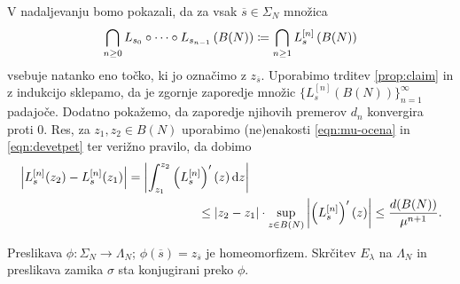 V nadaljevanju bomo pokazali, da za vsak \(\overline{s} \in \Sigma_N\) množica
\[\bigcap_{n \geq 0} L_{s_0} \circ \dots \circ L_{s_{n - 1}} \left( B (N) \right) \coloneq \bigcap_{n \geq 1} L_s^{[n]} \left( B (N) \right)\]
vsebuje natanko eno točko, ki jo označimo z \(z_{\overline{s}}\). Uporabimo trditev \ref{prop:claim} in z indukcijo sklepamo, da je zgornje zaporedje množic \(\{L_s^{[n]} (B (N))\}_{n = 1}^{\infty}\) padajoče. Dodatno pokažemo, da zaporedje njihovih premerov \(d_n\) konvergira proti \num{0}. Res, za \(z_1, z_2 \in B(N)\) uporabimo (ne)enakosti \eqref{eqn:mu-ocena} in \eqref{eqn:devetpet} ter verižno pravilo, da dobimo
\[ \begin{multlined}[12cm]
    \left| L_s^{[n]}(z_2) - L_s^{[n]}(z_1) \right| = \left| \int_{z_1}^{z_2} \prt{L_s^{[n]}}' (z) \, \dd z \right|\\
    \leq |z_2 - z_1| \cdot \sup_{z \in B(N)}\left| \left( L_s^{[n]} \right)'(z) \right| \leq \frac{d(B(N))}{\mu^{n+1}}.
\end{multlined} \]

\begin{izrek}
    Preslikava \(\phi \colon \Sigma_N \to \Lambda_N\); \(\phi (\overline{s}) = z_{\overline{s}}\) je homeomorfizem. Skrčitev \(E_\lambda\) na \(\Lambda_N\) in preslikava zamika \(\sigma\) sta konjugirani preko \(\phi\). 
\end{izrek}

